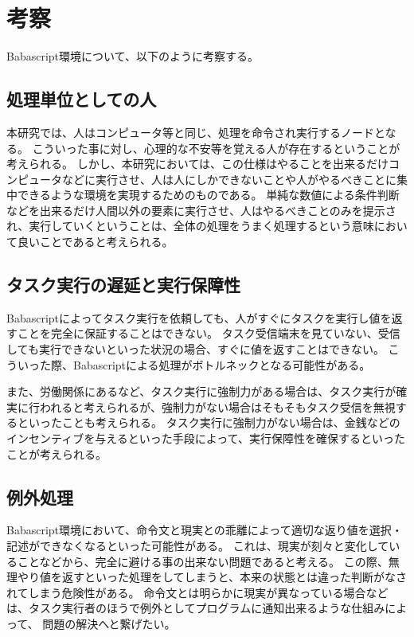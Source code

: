 \section{考察}\label{ux8003ux5bdf}

Babascript環境について、以下のように考察する。

\subsection{処理単位としての人}\label{ux51e6ux7406ux5358ux4f4dux3068ux3057ux3066ux306eux4eba}

本研究では、人はコンピュータ等と同じ、処理を命令され実行するノードとなる。
こういった事に対し、心理的な不安等を覚える人が存在するということが考えられる。
しかし、本研究においては、この仕様はやることを出来るだけコンピュータなどに実行させ、人は人にしかできないことや人がやるべきことに集中できるような環境を実現するためのものである。
単純な数値による条件判断などを出来るだけ人間以外の要素に実行させ、人はやるべきことのみを提示され、実行していくということは、全体の処理をうまく処理するという意味において良いことであると考えられる。

\subsection{タスク実行の遅延と実行保障性}\label{ux30bfux30b9ux30afux5b9fux884cux306eux9045ux5ef6ux3068ux5b9fux884cux4fddux969cux6027}

Babascriptによってタスク実行を依頼しても、人がすぐにタスクを実行し値を返すことを完全に保証することはできない。
タスク受信端末を見ていない、受信しても実行できないといった状況の場合、すぐに値を返すことはできない。
こういった際、Babascriptによる処理がボトルネックとなる可能性がある。

また、労働関係にあるなど、タスク実行に強制力がある場合は、タスク実行が確実に行われると考えられるが、強制力がない場合はそもそもタスク受信を無視するといったことも考えられる。
タスク実行に強制力がない場合は、金銭などのインセンティブを与えるといった手段によって、実行保障性を確保するといったことが考えられる。

\subsection{例外処理}\label{ux4f8bux5916ux51e6ux7406}

Babascript環境において、命令文と現実との乖離によって適切な返り値を選択・記述ができなくなるといった可能性がある。
これは、現実が刻々と変化していることなどから、完全に避ける事の出来ない問題であると考える。
この際、無理やり値を返すといった処理をしてしまうと、本来の状態とは違った判断がなされてしまう危険性がある。
命令文とは明らかに現実が異なっている場合などは、タスク実行者のほうで例外としてプログラムに通知出来るような仕組みによって、
問題の解決へと繋げたい。

